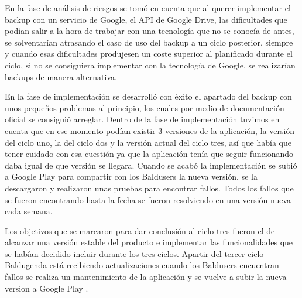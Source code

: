 En la fase de análisis de riesgos se tomó en cuenta que al querer implementar el backup con un servicio de Google, el API de Google Drive,  las dificultades que podían salir a la hora de trabajar con una tecnología que no se conocía de antes, se solventarían atrasando el caso de uso del backup a un ciclo posterior, siempre y cuando esas dificultades produjesen un coste superior al planificado durante el ciclo, si no se consiguiera implementar con la tecnología de Google, se realizarían backups de manera alternativa.

En la fase de implementación se desarrolló con éxito el apartado del backup con unos pequeños problemas al principio, los cuales por medio de documentación oficial se consiguió arreglar. Dentro de la fase de implementación tuvimos en cuenta que en ese momento podían existir 3 versiones de la aplicación, la versión del ciclo uno, la del ciclo dos y la versión actual del ciclo tres, así que había que tener cuidado con esa cuestión ya que la aplicación tenía que seguir funcionando daba igual de que versión se llegara. Cuando se acabó la implementación se subió a Google Play para compartir con los Baldusers la nueva versión, se la descargaron y realizaron unas pruebas para encontrar fallos. Todos los fallos que se fueron encontrando hasta la fecha se fueron resolviendo en una versión nueva cada semana.

Los objetivos que se marcaron para dar conclusión al ciclo tres fueron el de alcanzar una versión estable del producto e implementar las funcionalidades que se habían decidido incluir durante los tres ciclos. Apartir del tercer ciclo Baldugenda está recibiendo actualizaciones cuando los Baldusers encuentran fallos se realiza un mantenimiento de la aplicación y se vuelve a subir la nueva version a Google Play . 





















